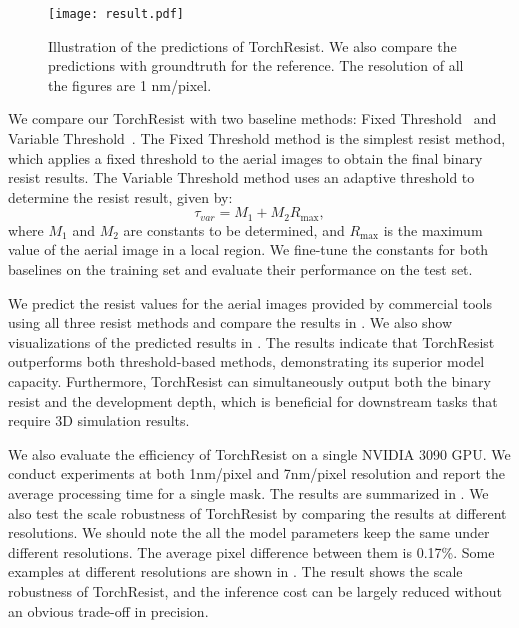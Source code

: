 \begin{figure}[t!]
    \centering
    \texttt{[image: result.pdf]}
    \caption{Illustration of the predictions of TorchResist. We also compare the predictions with groundtruth for the reference. The resolution of all the figures are 1 nm/pixel.}
    \label{fig:result}
\end{figure}

 We compare our TorchResist with two baseline methods: Fixed Threshold~\cite{banerjee2013iccad,zheng2024lithobench} and Variable Threshold~\cite{randall1999variable}. The Fixed Threshold method is the simplest resist method, which applies a fixed threshold to the aerial images to obtain the final binary resist results. The Variable Threshold method uses an adaptive threshold to determine the resist result, given by:
\begin{equation}
    \tau_{var} = M_1 + M_2 R_{\text{max}},
\end{equation}
where $M_1$ and $M_2$ are constants to be determined, and $R_{\text{max}}$ is the maximum value of the aerial image in a local region. We fine-tune the constants for both baselines on the training set and evaluate their performance on the test set.

 We predict the resist values for the aerial images provided by commercial tools using all three resist methods and compare the results in . We also show visualizations of the predicted results in . The results indicate that TorchResist outperforms both threshold-based methods, demonstrating its superior model capacity. Furthermore, TorchResist can simultaneously output both the binary resist and the development depth, which is beneficial for downstream tasks that require 3D simulation results.

 We also evaluate the efficiency of TorchResist on a single NVIDIA 3090 GPU. We conduct experiments at both 1nm/pixel and 7nm/pixel resolution and report the average processing time for a single mask. The results are summarized in . We also test the scale robustness of TorchResist by comparing the results at different resolutions. We should note the all the model parameters keep the same under different resolutions. The average pixel difference between them is 0.17\%. Some examples at different resolutions are shown in . The result shows the scale robustness of TorchResist, and the inference cost can be largely reduced without an obvious trade-off in precision.



